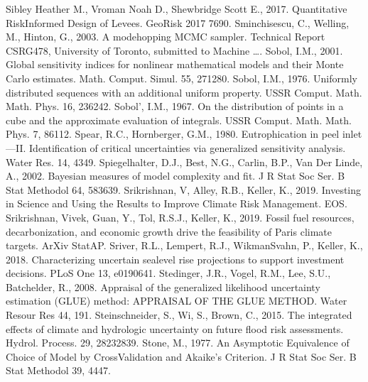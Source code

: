 \documentclass[letterpaper,10pt,english]{sphinxmanual}
\begin{document}
Sibley Heather M., Vroman Noah D., Shewbridge Scott E., 2017. Quantitative Risk\sphinxhyphen{}Informed Design of Levees. Geo\sphinxhyphen{}Risk 2017 76\textendash{}90. 
Sminchisescu, C., Welling, M., Hinton, G., 2003. A mode\sphinxhyphen{}hopping MCMC sampler. Technical Report CSRG\sphinxhyphen{}478, University of Toronto, submitted to Machine ….
Sobol, I.M., 2001. Global sensitivity indices for nonlinear mathematical models and their Monte Carlo estimates. Math. Comput. Simul. 55, 271\textendash{}280. 
Sobol, I.M., 1976. Uniformly distributed sequences with an additional uniform property. USSR Comput. Math. Math. Phys. 16, 236\textendash{}242.
Sobol’, I.M., 1967. On the distribution of points in a cube and the approximate evaluation of integrals. USSR Comput. Math. Math. Phys. 7, 86\textendash{}112. 
Spear, R.C., Hornberger, G.M., 1980. Eutrophication in peel inlet—II. Identification of critical uncertainties via generalized sensitivity analysis. Water Res. 14, 43\textendash{}49. 
Spiegelhalter, D.J., Best, N.G., Carlin, B.P., Van Der Linde, A., 2002. Bayesian measures of model complexity and fit. J R Stat Soc Ser. B Stat Methodol 64, 583\textendash{}639. 
Srikrishnan, V, Alley, R.B., Keller, K., 2019. Investing in Science and Using the Results to Improve Climate Risk Management. EOS.
Srikrishnan, Vivek, Guan, Y., Tol, R.S.J., Keller, K., 2019. Fossil fuel resources, decarbonization, and economic growth drive the feasibility of Paris climate targets. ArXiv StatAP.
Sriver, R.L., Lempert, R.J., Wikman\sphinxhyphen{}Svahn, P., Keller, K., 2018. Characterizing uncertain sea\sphinxhyphen{}level rise projections to support investment decisions. PLoS One 13, e0190641. 
Stedinger, J.R., Vogel, R.M., Lee, S.U., Batchelder, R., 2008. Appraisal of the generalized likelihood uncertainty estimation (GLUE) method: APPRAISAL OF THE GLUE METHOD. Water Resour Res 44, 191. 
Steinschneider, S., Wi, S., Brown, C., 2015. The integrated effects of climate and hydrologic uncertainty on future flood risk assessments. Hydrol. Process. 29, 2823\textendash{}2839. 
Stone, M., 1977. An Asymptotic Equivalence of Choice of Model by Cross\sphinxhyphen{}Validation and Akaike’s Criterion. J R Stat Soc Ser. B Stat Methodol 39, 44\textendash{}47.
\end{document}
